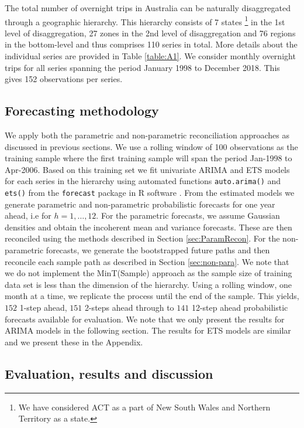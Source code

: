 \documentclass[12pt]{article}
\theoremstyle{definition}
\begin{document}
The total number of overnight trips in Australia can be naturally disaggregated through a geographic hierarchy. This hierarchy consists of 7 states \footnote{We have considered ACT as a part of New South Wales and Northern Territory as a state.} in the 1st level of disaggregation, 27 zones in the 2nd level of disaggregation and 76 regions in the bottom-level and thus comprises 110 series in total. More details about the individual series are provided in Table \ref{table:A1}.
We consider monthly overnight trips for all series spanning the period January 1998 to December 2018. This gives 152 observations per series.

\subsection{Forecasting methodology}

We apply both the parametric and non-parametric reconciliation approaches as discussed in previous sections. We use a rolling window of 100 observations as the training sample where the first training sample will span the period Jan-1998 to Apr-2006. Based on this training set we fit univariate ARIMA and ETS models for each series in the hierarchy using automated functions \verb|auto.arima()| and \verb|ets()| from the \verb|forecast| package \citep{Rforecast} in R software \citep{Rcore}.
From the estimated models we generate parametric and non-parametric probabilistic forecasts for one year ahead, i.e for $h=1,\dots,12$. For the parametric forecasts, we assume Gaussian densities and obtain the incoherent mean and variance forecasts. These are then reconciled using the methods described in Section \ref{sec:ParamRecon}. For the non-parametric forecasts, we generate the bootstrapped future paths and then reconcile each sample path as described in Section \ref{sec:non-para}. We note that we do not implement the MinT(Sample) approach as the sample size of training data set is less than the dimension of the hierarchy. Using a rolling window, one month at a time, we replicate the process until the end of the sample. This yields, $152$ 1-step ahead, $151$ 2-steps ahead through to $141$ 12-step ahead probabilistic forecasts available for evaluation. We note that we only present the results for ARIMA models in the following section. The results for ETS models are similar and we present these in the Appendix.


\subsection{Evaluation, results and discussion}
\end{document}
